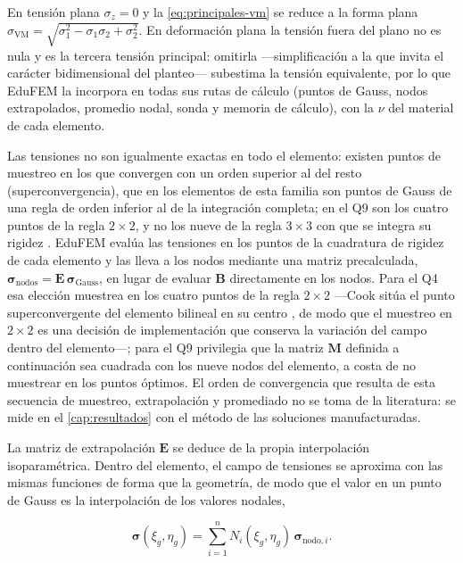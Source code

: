 En tensión plana $\sigma_z = 0$ y la \autoref{eq:principales-vm} se reduce a la forma plana $\sigma_{\mathrm{VM}} = \sqrt{\sigma_1^2 - \sigma_1\sigma_2 + \sigma_2^2}$. En deformación plana la tensión fuera del plano no es nula y es la tercera tensión principal: omitirla —simplificación a la que invita el carácter bidimensional del planteo— subestima la tensión equivalente, por lo que EduFEM la incorpora en todas sus rutas de cálculo (puntos de Gauss, nodos extrapolados, promedio nodal, sonda y memoria de cálculo), con la $\nu$ del material de cada elemento.

Las tensiones no son igualmente exactas en todo el elemento: existen puntos de muestreo en los que convergen con un orden superior al del resto (superconvergencia), que en los elementos de esta familia son puntos de Gauss de una regla de orden inferior al de la integración completa; en el Q9 son los cuatro puntos de la regla $2\times2$, y no los nueve de la regla $3\times3$ con que se integra su rigidez \autocite[pp.~230-231]{cook2002concepts}. EduFEM evalúa las tensiones en los puntos de la cuadratura de rigidez de cada elemento y las lleva a los nodos mediante una matriz precalculada, $\bm{\sigma}_{\text{nodos}} = \bm{E}\,\bm{\sigma}_{\text{Gauss}}$, en lugar de evaluar $\bm{B}$ directamente en los nodos. Para el Q4 esa elección muestrea en los cuatro puntos de la regla $2\times2$ —Cook sitúa el punto superconvergente del elemento bilineal en su centro \autocite[p.~230]{cook2002concepts}, de modo que el muestreo en $2\times2$ es una decisión de implementación que conserva la variación del campo dentro del elemento—; para el Q9 privilegia que la matriz $\bm{M}$ definida a continuación sea cuadrada con los nueve nodos del elemento, a costa de no muestrear en los puntos óptimos. El orden de convergencia que resulta de esta secuencia de muestreo, extrapolación y promediado no se toma de la literatura: se mide en el \autoref{cap:resultados} con el método de las soluciones manufacturadas.

La matriz de extrapolación $\bm{E}$ se deduce de la propia interpolación isoparamétrica. Dentro del elemento, el campo de tensiones se aproxima con las mismas funciones de forma que la geometría, de modo que el valor en un punto de Gauss es la interpolación de los valores nodales,

\begin{equation}
\bm{\sigma}(\xi_g,\eta_g) = \sum_{i=1}^{n} N_i(\xi_g,\eta_g)\,\bm{\sigma}_{\text{nodo},i}.
\label{eq:interp-tension}
\end{equation}

